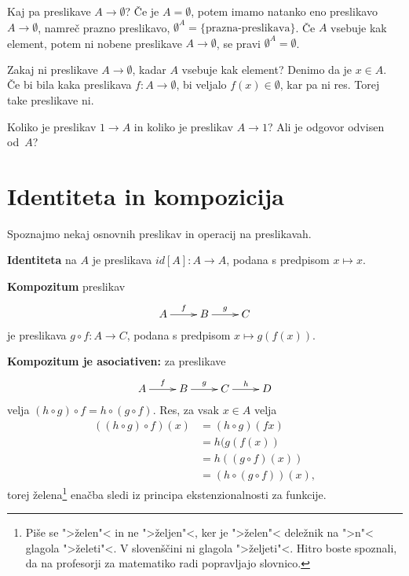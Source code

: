 Kaj pa preslikave $A \to \emptyset$?
%
Če je $A = \emptyset$, potem imamo natanko eno preslikavo $A \to \emptyset$, namreč prazno preslikavo, $\emptyset^A = \{ \textrm{prazna-preslikava} \}$.
%
Če $A$ vsebuje kak element, potem ni nobene preslikave $A \to \emptyset$, se pravi  $\emptyset^A = \emptyset$.

Zakaj ni preslikave $A \to \emptyset$, kadar $A$ vsebuje kak element? Denimo da je $x \in A$. Če bi bila kaka preslikava $f : A \to \emptyset$, bi
veljalo $f(x) \in \emptyset$, kar pa ni res. Torej take preslikave ni.

\begin{naloga}
  Koliko je preslikav $1 \to A$ in koliko je preslikav $A \to 1$?
  Ali je odgovor odvisen od~$A$?
\end{naloga}

\section{Identiteta in kompozicija}

Spoznajmo nekaj osnovnih preslikav in operacij na preslikavah.

\textbf{Identiteta} na $A$ je preslikava $id[A] : A \to A$, podana s predpisom $x \mapsto x$.

\textbf{Kompozitum} preslikav
%
\begin{equation*}
  \xymatrix{
    {A} \ar[r]^f & {B} \ar[r]^g & {C}
  }
\end{equation*}
%
je preslikava $g \circ f : A \to C$, podana s predpisom $x \mapsto g(f(x))$.

\textbf{Kompozitum je asociativen:} za preslikave
%
\begin{equation*}
  \xymatrix{
    {A} \ar[r]^f & {B} \ar[r]^g & {C} \ar[r]^h & {D}
  }
\end{equation*}
%
velja $(h \circ g) \circ f = h \circ (g \circ f)$. Res, za vsak $x \in A$ velja
%
\begin{align*}
  ((h \circ g) \circ f)(x)
  &= (h \circ g) (f x) \\
  &=  h (g (f (x)) \\
  &= h ((g \circ f)(x)) \\
  &= (h \circ (g \circ f))(x),
\end{align*}
%
torej želena\footnote{Piše se ">želen"< in ne ">željen"<, ker je ">želen"< deležnik na
  ">n"< glagola ">želeti"<. V slovenščini ni glagola ">željeti"<. Hitro boste spoznali, da na profesorji za matematiko radi popravljajo slovnico.} enačba sledi iz principa ekstenzionalnosti za funkcije.

